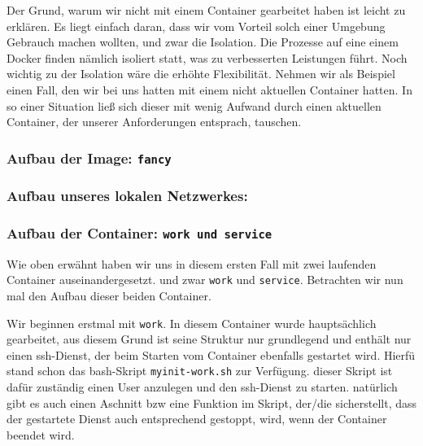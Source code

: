 Der Grund, warum wir nicht mit einem Container gearbeitet haben ist leicht zu erklären. Es liegt einfach daran, dass wir vom Vorteil solch einer Umgebung Gebrauch machen wollten, und zwar die Isolation. Die Prozesse auf eine einem Docker finden nämlich isoliert statt, was zu verbesserten Leistungen führt. Noch wichtig zu der Isolation wäre die erhöhte Flexibilität. Nehmen wir als Beispiel einen Fall, den wir bei uns hatten mit einem nicht aktuellen Container hatten. In so einer Situation ließ sich dieser mit wenig Aufwand durch einen aktuellen Container, der unserer Anforderungen entsprach, tauschen.\\

\subsubsection{Aufbau der Image: \texttt{fancy}}

\subsubsection{Aufbau unseres lokalen Netzwerkes: }

\subsubsection{Aufbau der Container: \texttt{work und service}}

Wie oben erwähnt haben wir uns in diesem ersten Fall mit zwei laufenden Container auseinandergesetzt. und zwar \texttt{work} und \texttt{service}. Betrachten wir nun mal den Aufbau dieser beiden Container.

Wir beginnen erstmal mit \texttt{work}. In diesem Container wurde hauptsächlich gearbeitet, aus diesem Grund ist seine Struktur nur grundlegend und enthält nur einen ssh-Dienst, der beim Starten vom Container ebenfalls gestartet wird. Hierfü stand schon das bash-Skript \texttt{myinit-work.sh} zur Verfügung. dieser Skript ist dafür zuständig einen User anzulegen und den ssh-Dienst zu starten. natürlich gibt es auch einen Aschnitt bzw eine Funktion im Skript, der/die sicherstellt, dass der gestartete Dienst auch entsprechend gestoppt, wird, wenn der Container beendet wird.



